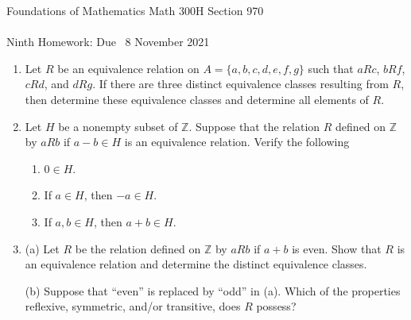 \documentclass[12pt]{article}
\newcommand{\ZZ}{{\mathbb Z}}  %
\begin{document}
\LARGE 
\noindent
{\color{Maroon}Foundations of Mathematics \hfill Math 300H Section 970}\vspace{2pt}\\
\Large \vspace{2pt}\\
\large
Ninth Homework: \hfill Due \  8 November 2021
\normalsize\medskip


\noindent{\color{blue}\rule{528.3675pt}{2pt}}


\begin{enumerate}  %

   
\item Let $R$ be an equivalence relation on $A = \{a, b, c, d, e, f , g\}$ such that $a R c$, $b R f$,  $c R d$, and $d R g$.
    If there are three distinct equivalence classes resulting from $R$, then determine these equivalence classes and
    determine all elements of $R$.

\item  Let $H$ be a nonempty subset of $\ZZ$.
  Suppose that the relation $R$ defined on $\ZZ$ by $a R b$ if $a - b\in  H$ is an equivalence relation.
  Verify the following
  \begin{enumerate}
    \item $0\in H$.
    \item If $a\in H$, then $-a\in H$.
    \item If $a,b\in H$, then $a+b\in H$.
  \end{enumerate}

\item
  (a) Let $R$ be the relation defined on $\ZZ$ by $a R b$ if $a+b$ is even.
       Show that $R$ is an equivalence relation and determine the distinct equivalence classes.

 (b) Suppose that ``even'' is replaced by ``odd'' in (a).
       Which of the properties reflexive, symmetric, and/or transitive, does $R$ possess?


\end{enumerate}
\end{document}
